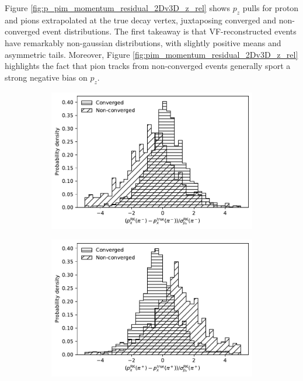 Figure \ref{fig:p_pim_momentum_residual_2Dv3D_z_rel} shows $p_z$ pulls for proton and pions extrapolated at the \lz true decay vertex, juxtaposing converged and non-converged event distributions.
The first takeaway is that VF-reconstructed events have remarkably non-gaussian distributions, with slightly positive means and asymmetric tails. 
Moreover, Figure \ref{fig:pim_momentum_residual_2Dv3D_z_rel} highlights the fact that pion tracks from non-converged events generally sport a strong negative bias on $p_z$.

\begin{figure}[t]
	\centering
	\begin{subfigure}{.45\textwidth}
		\includegraphics[width=\textwidth]{graphics/03-vertex_reconstruction/NONCONVERGED_pim_momentum_residual_2Dv3D_x_rel_matter.pdf}
		\caption{}
		\label{fig:pim_momentum_residual_2Dv3D_x_rel_matter}
	\end{subfigure}
	\begin{subfigure}{.45\textwidth}
		\includegraphics[width=\textwidth]{graphics/03-vertex_reconstruction/NONCONVERGED_pim_momentum_residual_2Dv3D_x_rel_antimatter.pdf}

\end{subfigure}
\end{figure}

